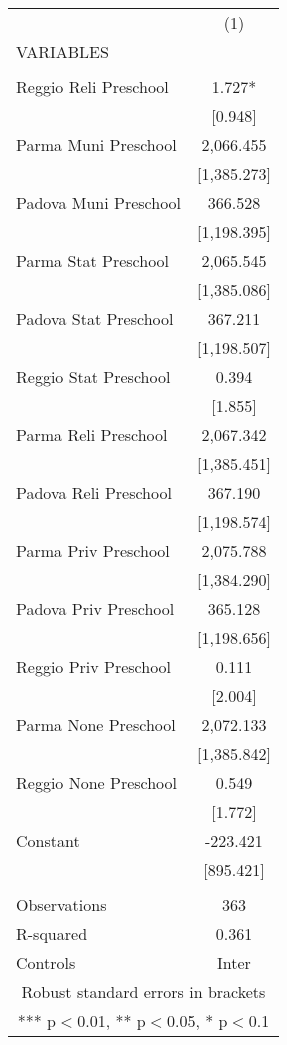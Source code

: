 \begin{tabular}{lc} \hline
 & (1) \\
VARIABLES &  \\ \hline
 &  \\
Reggio Reli Preschool & 1.727* \\
 & [0.948] \\
Parma Muni Preschool & 2,066.455 \\
 & [1,385.273] \\
Padova Muni Preschool & 366.528 \\
 & [1,198.395] \\
Parma Stat Preschool & 2,065.545 \\
 & [1,385.086] \\
Padova Stat Preschool & 367.211 \\
 & [1,198.507] \\
Reggio Stat Preschool & 0.394 \\
 & [1.855] \\
Parma Reli Preschool & 2,067.342 \\
 & [1,385.451] \\
Padova Reli Preschool & 367.190 \\
 & [1,198.574] \\
Parma Priv Preschool & 2,075.788 \\
 & [1,384.290] \\
Padova Priv Preschool & 365.128 \\
 & [1,198.656] \\
Reggio Priv Preschool & 0.111 \\
 & [2.004] \\
Parma None Preschool & 2,072.133 \\
 & [1,385.842] \\
Reggio None Preschool & 0.549 \\
 & [1.772] \\
Constant & -223.421 \\
 & [895.421] \\
 &  \\
Observations & 363 \\
R-squared & 0.361 \\
 Controls & Inter \\ \hline
\multicolumn{2}{c}{ Robust standard errors in brackets} \\
\multicolumn{2}{c}{ *** p$<$0.01, ** p$<$0.05, * p$<$0.1} \\
\end{tabular}
